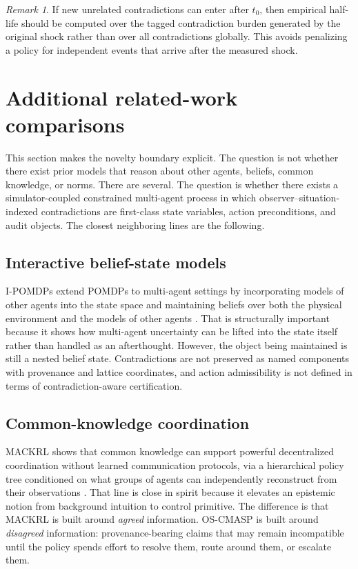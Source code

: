 \documentclass[11pt]{article}
\newcommand{\1}{\mathbf{1}}
\theoremstyle{definition}
\theoremstyle{plain}
\theoremstyle{remark}
\newtheorem{remark}[definition]{Remark}
\begin{document}
\begin{remark}
\label{supp:rem:half-life-measurement}
If new unrelated contradictions can enter after $t_0$, then empirical half-life should be computed over the tagged contradiction burden generated by the original shock rather than over all contradictions globally. This avoids penalizing a policy for independent events that arrive after the measured shock.
\end{remark}

\section{Additional related-work comparisons}
\label{supp:sec:related}

This section makes the novelty boundary explicit. The question is not whether there exist prior models that reason about other agents, beliefs, common knowledge, or norms. There are several. The question is whether there exists a simulator-coupled constrained multi-agent process in which observer--situation-indexed contradictions are first-class state variables, action preconditions, and audit objects. The closest neighboring lines are the following.

\subsection{Interactive belief-state models}

I-POMDPs extend POMDPs to multi-agent settings by incorporating models of other agents into the state space and maintaining beliefs over both the physical environment and the models of other agents \citep{GmytrasiewiczDoshi2005}. That is structurally important because it shows how multi-agent uncertainty can be lifted into the state itself rather than handled as an afterthought. However, the object being maintained is still a nested belief state. Contradictions are not preserved as named components with provenance and lattice coordinates, and action admissibility is not defined in terms of contradiction-aware certification.

\subsection{Common-knowledge coordination}

MACKRL shows that common knowledge can support powerful decentralized coordination without learned communication protocols, via a hierarchical policy tree conditioned on what groups of agents can independently reconstruct from their observations \citep{SchroederdeWitt2019MACKRL}. That line is close in spirit because it elevates an epistemic notion from background intuition to control primitive. The difference is that MACKRL is built around \emph{agreed} information. OS-CMASP is built around \emph{disagreed} information: provenance-bearing claims that may remain incompatible until the policy spends effort to resolve them, route around them, or escalate them.
\end{document}
